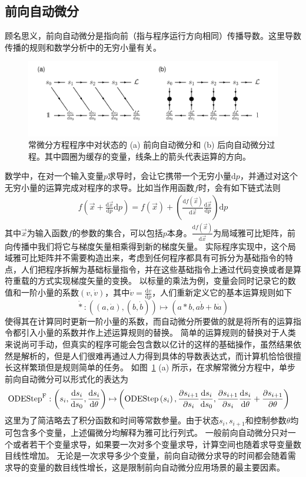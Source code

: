 \documentclass[A4,twoside,UTF8]{ctexart}
\def\D{\mathrm{d}}
\begin{document}
\subsection{前向自动微分}
    顾名思义，前向自动微分是指向前（指与程序运行方向相同）传播导数。这里导数传播的规则和数学分析中的无穷小量有关。
    \begin{figure}[t]
        \centering
        \includegraphics[width=0.9\columnwidth,trim={0 0cm 0 0},clip]{fig3.pdf}
        \caption{常微分方程程序中对状态的 (a) 前向自动微分和 (b) 后向自动微分过程。其中圆圈为缓存的变量，线条上的箭头代表运算的方向。}\label{fig:autodifftypes}
\end{figure}
数学中，在对一个输入变量$p$求导时，会让它携带一个无穷小量$\D p$，并通过对这个无穷小量的运算完成对程序的求导。比如当作用函数$f$时，会有如下链式法则
\begin{align}
    f(\vec x+ \frac{\D \vec x}{\D p} \D p) = f(\vec x) + \left(\frac{\D f(\vec x)}{\D \vec x}\frac{\D \vec x}{\D p}\right) \D p
\end{align}
其中$\vec x$为输入函数$f$的参数的集合，可以包括$p$本身。$\frac{\D f(\vec x)}{\D \vec x}$为局域雅可比矩阵，前向传播中我们将它与梯度矢量相乘得到新的梯度矢量。
实际程序实现中，这个局域雅可比矩阵并不需要构造出来，考虑到任何程序都具有可拆分为基础指令的特点，人们把程序拆解为基础标量指令，并在这些基础指令上通过代码变换或者是算符重载的方式实现梯度矢量的变换。
以标量的乘法为例，变量会同时记录它的数值和一阶小量的系数$(v, \dot v)$，其中$\dot v = \frac{\D v}{\D p}$，人们重新定义它的基本运算规则如下
$$\dot{*}: ((a, \dot a), (b, \dot b)) \mapsto (a * b, a \dot b + b \dot a)$$
使得其在计算同时更新一阶小量的系数，而自动微分所要做的就是将所有的运算指令都引入小量的系数并作上述运算规则的替换。
简单的运算规则的替换对于人类来说尚可手动，但真实的程序可能会包含数以亿计的这样的基础操作，虽然结果依然是解析的，但是人们很难再通过人力得到具体的导数表达式，而计算机恰恰很擅长这样繁琐但是规则简单的任务。
如图~\ref{fig:autodifftypes} (a) 所示，在求解常微分方程中，单步前向自动微分可以形式化的表达为
\begin{align*}
    {\rm ODEStep}^{\rm F} : \left(s_{i}, \frac{\D s_{i}}{\D s_0}, \frac{\D s_{i}}{\D \theta}\right)
        \mapsto &\left({\rm ODEStep}\left(s_{i}\right), \frac{\partial s_{i+1}}{\partial s_i} \frac{\D s_{i}}{\D s_0},
        \frac{\partial s_{i+1}}{\partial s_i} \frac{\D s_{i}}{\D \theta} + \frac{\partial s_{i+1}}{\partial \theta}\right)
\end{align*}
这里为了简洁略去了积分函数和时间等常数参量。由于状态$s_i, s_{i+1}$和控制参数$\theta$均可包含多个变量，上述偏微分均解释为雅可比行列式。
一般前向自动微分只对一个或者若干个变量求导，如果要一次对多个变量求导，计算空间也随着求导变量数目线性增加。
无论是一次求导多少个变量，前向自动微分求导的时间都会随着需求导的变量的数目线性增长，这是限制前向自动微分应用场景的最主要因素。
\end{document}
